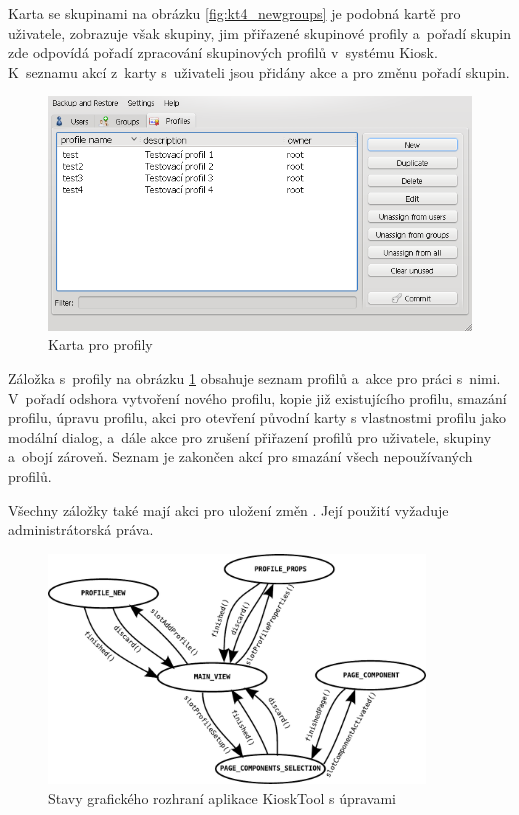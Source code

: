 Karta se skupinami na obrázku \ref{fig:kt4_newgroups} je podobná kartě pro uživatele, zobrazuje však skupiny, jim přiřazené skupinové profily a~pořadí skupin zde odpovídá pořadí zpracování skupinových profilů v~systému Kiosk. K~seznamu akcí z~karty s~uživateli jsou přidány akce  a  pro změnu pořadí skupin.

\begin{figure}[h]
    \centering
    \includegraphics[width=13cm]{obrazky/navrh-profiles-fixd.png}
    \caption{Karta pro profily}
    \label{fig:kt4_newprofiles}
\end{figure}

Záložka s~profily na obrázku \ref{fig:kt4_newprofiles} obsahuje seznam profilů a~akce pro práci s~nimi. V~pořadí odshora vytvoření nového profilu, kopie již existujícího profilu, smazání profilu, úpravu profilu, akci pro otevření původní karty s vlastnostmi profilu jako modální dialog, a~dále akce pro zrušení přiřazení profilů pro uživatele, skupiny a~obojí zároveň. Seznam je zakončen akcí pro smazání všech nepoužívaných profilů.

Všechny záložky také mají akci pro uložení změn . Její použití vyžaduje administrátorská práva.

\begin{figure}[h]
    \centering
    \includegraphics[width=10cm]{obrazky/stated-new.pdf}
    \caption{Stavy grafického rozhraní aplikace KioskTool s úpravami}
    \label{fig:kioskstatesnew}
\end{figure}

